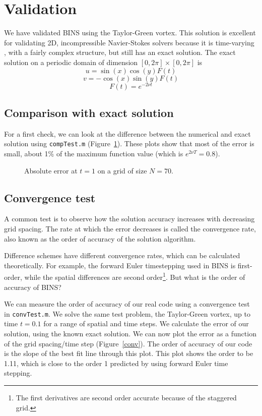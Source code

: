 \documentclass[12pt]{article}
\begin{document}
\section{Validation}
We have validated BINS using the Taylor-Green vortex.  This solution is excellent for validating 2D, incompressible Navier-Stokes solvers because it is time-varying , with a fairly complex structure, but still has an exact solution.  
The exact solution on a periodic domain of dimension $[0,2\pi] \times [0,2\pi]$ is
\[ u=\sin (x) \cos (y) F(t)\]
\[ v=-\cos (x) \sin (y) F(t)\]
\[ F(t)=e^{-2\nu t}\]

\subsection{Comparison with exact solution}
For a first check, we can look at the difference between the numerical and exact solution using \texttt{compTest.m} (Figure~\ref{error}).  These plots show that most of the error is small, about 1\% of the maximum function value (which is $e^{2\nu T}=0.8$).

\begin{center}
\begin{figure*}
\center
{}  
\caption{Absolute error at $t=1$ on a grid of size $N=70$.}
\label{error}
\end{figure*}
\end{center}

\subsection{Convergence test}
A common test is to observe how the solution accuracy increases with decreasing grid spacing.  The rate at which the error decreases is called the convergence rate, also known as the order of accuracy of the solution algorithm.  

Difference schemes have different convergence rates, which can be calculated theoretically.  For example, the forward Euler timestepping used in BINS is first-order, while the spatial differences are second order\footnote{The first derivatives are second order accurate because of the staggered grid.}.  But what is the order of accuracy of BINS?

We can measure the order of accuracy of our real code using a convergence test in \texttt{convTest.m}.  We solve the same test problem, the Taylor-Green vortex, up to time $t=0.1$ for a range of spatial and time steps.  We calculate the error of our solution, using the known exact solution.  We can now plot the error as a function of the grid spacing/time step (Figure~\ref{conv}).  The order of accuracy of our code is the slope of the best fit line through this plot.  This plot shows the order to be 1.11, which is close to the order 1 predicted by using forward Euler time stepping.
\end{document}

